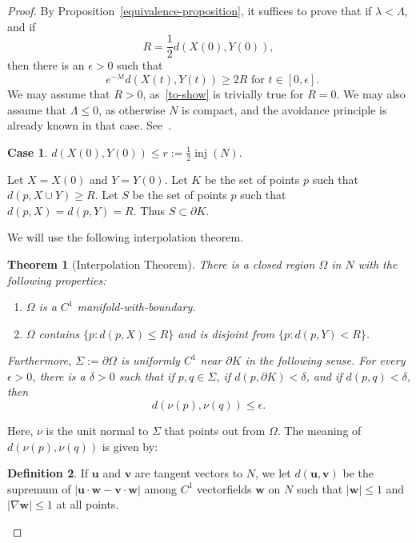 \documentclass{amsart}
\newcommand{\inj}{\operatorname{inj}}    %
\newcommand{\eps}{\epsilon}
\newcommand{\vv}{\mathbf v}
\newcommand{\ww}{\mathbf w}
\newcommand{\uu}{\mathbf{u}}
\newtheorem{theorem}    {Theorem}   %
\theoremstyle{definition}
\newtheorem{definition}  [theorem] {Definition}
\theoremstyle{definition}
\newtheorem{case}   {Case}
\begin{document}
\begin{proof}

By Proposition~\ref{equivalence-proposition}, it suffices to prove that if $\lambda<\Lambda$, and if 
\[
   R = \frac12 d(X(0),Y(0)),
\]
then there is an $\eps>0$ such that 
\begin{equation}\label{to-show}
   \text{ $e^{-\lambda t} d(X(t),Y(t)) \ge 2R$ for $t\in [0,\eps]$}.
\end{equation}
We may assume that $R>0$, as~\eqref{to-show} is trivially true for $R=0$.
We may also assume that $\Lambda\le 0$, as otherwise $N$ is compact,
and the avoidance principle is already known in that case.  See~\cite{hershkovits-w-avoid}.


\begin{case}\label{case-1} $d(X(0),Y(0)) \le  r:= \frac12 \inj(N)$.
\end{case}

Let $X=X(0)$ and $Y=Y(0)$.
Let $K$ be the set of points $p$ such that $d(p,X\cup Y)\ge R$.
Let $S$ be the set of points $p$ such that $d(p,X)=d(p,Y)=R$.
Thus $S\subset \partial K$.

We will use the following interpolation theorem.

\begin{theorem}[Interpolation Theorem]\label{restated}
There is a closed region $\Omega$ in $N$ with the following properties:
\begin{enumerate}
\item $\Omega$ is a $C^1$ manifold-with-boundary.
\item $\Omega$ contains $\{p: d(p,X)\le R\}$ and is disjoint from $\{p: d(p,Y)<R\}$.
\end{enumerate}
Furthermore,  $\Sigma:=\partial\Omega$ is uniformly $C^1$ near $\partial K$ in the following sense.
For every $\eps>0$, there is a $\delta>0$ such that if $p,q\in \Sigma$, if $d(p,\partial K)<\delta$,
 and  if $d(p,q)<\delta$, then 
\[
   d(\nu(p),\nu(q)) \le  \eps.
\]
\end{theorem}

Here, $\nu$ is the unit normal to $\Sigma$ that points out from $\Omega$.
The meaning of $d(\nu(p),\nu(q))$ is given by:

\begin{definition}\label{tangent-distance-definition}
If $\uu$ and $\vv$ are tangent vectors to $N$, we let $d(\uu,\vv)$
be the supremum of 
$
   |\uu\cdot \ww - \vv\cdot \ww|
$
among $C^1$ vectorfields  $\ww$ on $N$ such that $|\ww|\le 1$ and 
$|\nabla \ww|\le 1$ at all points.
\end{definition}


\end{proof}
\end{document}
